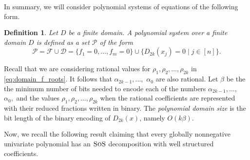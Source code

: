 \documentclass[11pt]{article}
\newcommand{\sos}{\text{\sc{SoS}}}
\newcommand{\F}{\mathcal{F}}
\newcommand{\1}{\textbf{1}}
\newcommand{\Do}{\mathcal{D}}
\newtheorem{definition}[theorem]{Definition}
\begin{document}
In summary, we will consider polynomial systems of equations of the following form.

\begin{definition}
    Let $D$ be a finite domain. A \emph{polynomial system over a finite domain $D$} is defined as a set $\mathcal{P}$ of the form
    \begin{equation}\label{eq:axiomsF}
        \mathcal{P} = \F \cup \Do =\{f_1=0,\ldots,f_m=0\} \cup \{D_{2k}(x_j)=0\mid j\in[n]\}.
    \end{equation}
\end{definition}

Recall that we are considering rational values for $\rho_{1},\rho_{2},\ldots,\rho_{2k}$ in \eqref{eq:domain_f_roots}. It follows that $\alpha_{2k-1}, \ldots,$ $\alpha_0$ are also rational. Let $\beta$ be the the minimum number of bits needed to encode each of the numbers $\alpha_{2k-1}, \ldots,$ $\alpha_0,$  and the values $\rho_1, \rho_2, \dots, \rho_{2k}$ when the rational coefficients are represented with their reduced fractions written in binary.
The \emph{polynomial domain size} is the bit length of the binary encoding of $D_{2k}(x)$, namely $O(k\beta)$. 



Now, we recall the following result claiming that every globally nonnegative univariate polynomial has an $\sos$ decomposition with well structured coefficients.
\end{document}
